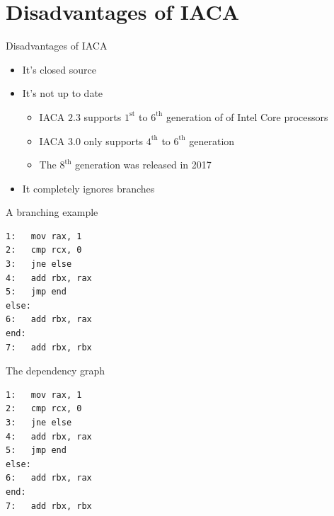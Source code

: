 \documentclass[10pt, tikz,border=2mm, xcolor=dvipsnames]{beamer}
\begin{document}
\section{Disadvantages of IACA}

\begin{frame}[fragile]{Disadvantages of IACA}
\begin{itemize}[<+- | alert@+>]
    \item It's closed source
    \item It's not up to date
    \begin{itemize}[<+- | alert@+>]
        \item IACA $2.3$ supports $1^{\text{st}}$ to $6^{\text{th}}$ generation of of Intel Core processors
        \item IACA $3.0$ only supports $4^{\text{th}}$ to $6^{\text{th}}$ generation
        \item The $8^{\text{th}}$ generation was released in 2017
    \end{itemize}
    \item It completely ignores branches
\end{itemize}
\end{frame}

\begin{frame}[fragile]{A branching example}
\begin{verbatim}
1:   mov rax, 1
2:   cmp rcx, 0
3:   jne else
4:   add rbx, rax
5:   jmp end
else:
6:   add rbx, rax
end:
7:   add rbx, rbx
\end{verbatim}
\end{frame}

\begin{frame}[fragile]{The dependency graph}

\begin{minipage}{.35\textwidth}
  \begin{verbatim}
1:   mov rax, 1
2:   cmp rcx, 0
3:   jne else
4:   add rbx, rax
5:   jmp end
else:
6:   add rbx, rax
end:
7:   add rbx, rbx
\end{verbatim}
\end{minipage}%
\begin{minipage}{.5\textwidth}
\end{minipage}


\end{frame}
\end{document}
